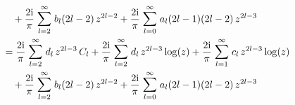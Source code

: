 \begin{align*}
 &\quad  + \frac{2 \ii}{\pi} \; \mathlarger{\sum}_{l = 2}^\infty \; b_l (2l - 2) \, z^{2l - 2}
  + \frac{2 \ii}{\pi}\; \mathlarger{\sum}_{l = 0}^\infty \; a_l (2l - 1) (2l - 2) \, z^{2l - 3} \\
  &= \frac{2 \ii}{\pi} \; \mathlarger{\sum}_{l = 2}^\infty \; d_l \, z^{2l - 3} \, C_l + \frac{2 \ii}{\pi} \; \mathlarger{\sum}_{l = 2}^\infty \; d_l \, z^{2l - 3} \log(z) + \frac{2 \ii}{\pi} \; \mathlarger{\sum}_{l = 1}^\infty \; c_l \, z^{2l - 3} \log(z) \\
 &\quad  + \frac{2 \ii}{\pi} \; \mathlarger{\sum}_{l = 2}^\infty \; b_l (2l - 2) \, z^{2l - 2}
  + \frac{2 \ii}{\pi}\; \mathlarger{\sum}_{l = 0}^\infty \; a_l (2l - 1) (2l - 2) \, z^{2l - 3} 
\end{align*}

